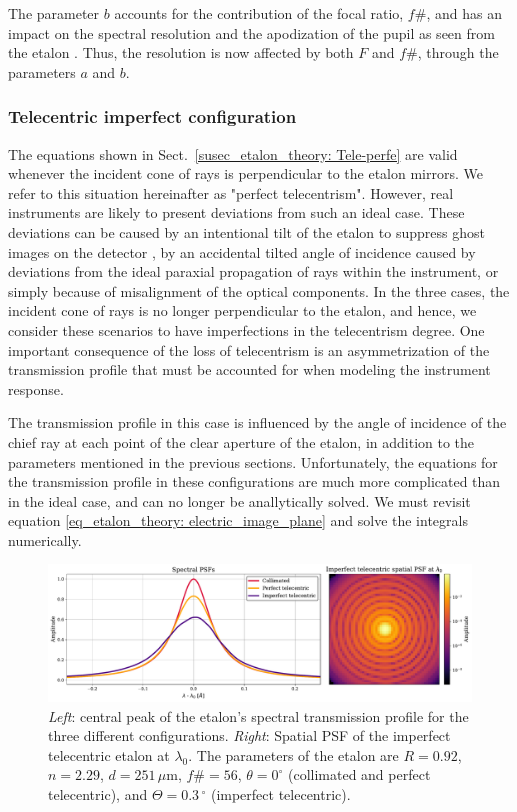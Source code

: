 The parameter $b$ accounts for the contribution of the focal ratio, $f\#$, and has an impact on the spectral resolution and the apodization of the pupil as seen from the etalon \citep{beckers}. Thus, the resolution is now affected by both $F$ and $f\#$, through the parameters $a$ and $b$.

\subsubsection{\label{etalon_theory: Tele-imperfe}Telecentric imperfect configuration}
The equations shown in Sect.~\ref{susec_etalon_theory: Tele-perfe} are valid whenever the incident cone of rays is perpendicular to the etalon mirrors. We refer to this situation hereinafter as "perfect telecentrism". However, real instruments are likely to present deviations from such an ideal case. These deviations can be caused by an intentional tilt of the etalon to suppress ghost images on the detector \citep{ghosts-etalon}, by an accidental tilted angle of incidence caused by deviations from the ideal paraxial propagation of rays within the instrument, or simply because of misalignment of the optical components. In the three cases, the incident cone of rays is no longer perpendicular to the etalon, and hence, we consider these scenarios to have imperfections in the telecentrism degree. One important consequence of the loss of telecentrism is an asymmetrization of the transmission profile that must be accounted for when modeling the instrument response.

The transmission profile in this case is influenced by the angle of incidence of the chief ray at each point of the clear aperture of the etalon, in addition to the parameters mentioned in the previous sections. Unfortunately, the equations for the transmission profile in these configurations are much more complicated than in the ideal case, and can no longer be anallytically solved. We must revisit equation \eqref{eq_etalon_theory: electric_image_plane} and solve the integrals numerically.

\begin{figure}
    \centering
    \includegraphics[width = \textwidth]{figures/EtalonChallenges/etalon_setups_profiles.pdf}
    \caption{\textit{Left}: central peak of the etalon's spectral transmission profile for the three different configurations. \textit{Right}: Spatial PSF of the imperfect telecentric etalon at $\lambda _ 0$. The parameters of the etalon are $R = 0.92$, $n = 2.29$, $d = 251 \, \mu \mathrm{m}$, $f\#=56$, $\theta = 0 ^{\circ}$ (collimated and perfect telecentric), and $\Theta = 0.3\,^{\circ}$ (imperfect telecentric).}
    \label{fig_etalon_theory:Profiles-configs}
\end{figure}

